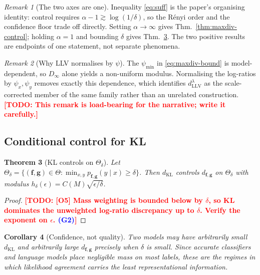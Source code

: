 \documentclass{article}
\newcommand{\TODO}[1]{\textcolor{red}{\textbf{[TODO: #1]}}}
\newcommand{\GATE}[1]{\textcolor{blue}{\textsf{\small (#1)}}}
\newcommand{\bff}{\mathbf{f}}
\newcommand{\bfg}{\mathbf{g}}
\newcommand{\dKL}{d_{\mathrm{KL}}}
\newcommand{\dLLV}{d^{\lambda}_{\mathrm{LLV}}}
\newcommand{\dfg}{d_{\bff,\bfg}}
\newcommand{\Dinf}{D_{\infty}}
\newcommand{\psix}{\psi_{x}}
\newcommand{\psiy}{\psi_{y}}
\newcommand{\Thetadelta}{\Theta_{\delta}}
\theoremstyle{plain}
\newtheorem{theorem}{Theorem}
\newtheorem{corollary}[theorem]{Corollary}
\theoremstyle{definition}
\theoremstyle{remark}
\newtheorem{remark}[theorem]{Remark}
\begin{document}
\begin{remark}[The two axes are one]
\label{rem:unify}
Inequality \eqref{eq:suff} is the paper's organising identity: control requires
$\alpha-1\gtrsim\log(1/\delta)$, so the R\'enyi order and the confidence floor
trade off directly. Setting $\alpha\to\infty$ gives
Thm.~\ref{thm:maxdiv-control}; holding $\alpha=1$ and bounding $\delta$ gives
Thm.~\ref{thm:kl-conditional}. The two positive results are endpoints of one
statement, not separate phenomena.
\end{remark}

\begin{remark}[Why LLV normalises by $\psi$]
\label{rem:whypsi}
The $\psi_{\min}$ in \eqref{eq:maxdiv-bound} is model-dependent, so
$\Dinf$ alone yields a non-uniform modulus. Normalising the log-ratios by
$\psix,\psiy$ removes exactly this dependence, which identifies $\dLLV$ as the
scale-corrected member of the same family rather than an unrelated
construction.
\TODO{This remark is load-bearing for the narrative; write it carefully.}
\end{remark}

\subsection{Conditional control for KL}
\label{sec:klcond}

\begin{theorem}[KL controls on $\Thetadelta$]
\label{thm:kl-conditional}
Let $\Thetadelta=\{(\bff,\bfg)\in\Theta:\min_{x,y}p_{\bff,\bfg}(y\mid x)\ge\delta\}$.
Then $\dKL$ controls $\dfg$ on $\Thetadelta$ with modulus
$h_{\delta}(\epsilon)=C(M)\sqrt{\epsilon/\delta}$.
\end{theorem}
\begin{proof}
\TODO{[O5] Mass weighting is bounded below by $\delta$, so KL dominates the
unweighted log-ratio discrepancy up to $\delta$. Verify the exponent on
$\epsilon$. \GATE{G2}}
\end{proof}

\begin{corollary}[Confidence, not quality]
\label{cor:confidence}
Two models may have arbitrarily small $\dKL$ and arbitrarily large $\dfg$
precisely when $\delta$ is small. Since accurate classifiers and language models
place negligible mass on most labels, these are the regimes in which likelihood
agreement carries the least representational information.
\end{corollary}
\end{document}
